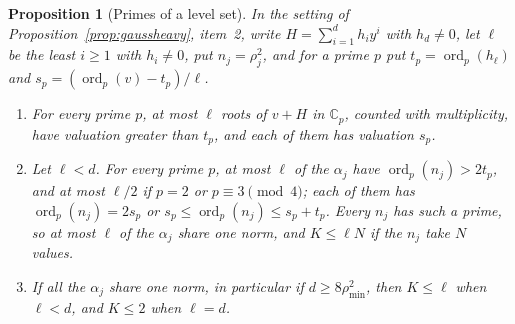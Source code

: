 \documentclass[11pt]{article}
\newtheorem{proposition}[theorem]{Proposition}
\begin{document}
\begin{proposition}[Primes of a level set]\label{prop:gaussprimes}
In the setting of Proposition~\ref{prop:gaussheavy}, item~2, write
$H=\sum_{i=1}^dh_iy^i$ with $h_d\ne0$, let $\ell$ be the least $i\ge1$ with
$h_i\ne0$, put $n_j=\rho_j^2$, and for a prime $p$ put
$t_p=\operatorname{ord}_p(h_\ell)$ and
$s_p=(\operatorname{ord}_p(v)-t_p)/\ell$.
\begin{enumerate}
\item For every prime $p$, at most $\ell$ roots of $v+H$ in $\mathbb C_p$,
counted with multiplicity, have valuation greater than $t_p$, and each of
them has valuation $s_p$.
\item Let $\ell<d$.  For every prime $p$, at most $\ell$ of the $\alpha_j$ have
$\operatorname{ord}_p(n_j)>2t_p$, and at most $\ell/2$ if $p=2$ or
$p\equiv3\pmod4$; each of them has $\operatorname{ord}_p(n_j)=2s_p$ or
$s_p\le\operatorname{ord}_p(n_j)\le s_p+t_p$.  Every $n_j$ has such a prime,
so at most $\ell$ of the $\alpha_j$ share one norm, and $K\le\ell N$ if the
$n_j$ take $N$ values.
\item If all the $\alpha_j$ share one norm, in particular if
$d\ge8\rho_{\min}^2$, then $K\le\ell$ when $\ell<d$, and $K\le2$ when $\ell=d$.
\end{enumerate}
\end{proposition}
\end{document}
